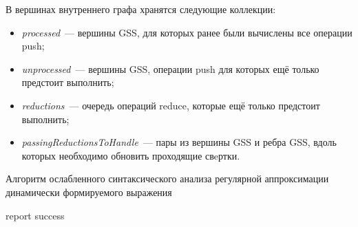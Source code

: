 В вершинах внутреннего графа хранятся следующие коллекции:
\begin{itemize}
  \item \emph{processed}~--- вершины GSS, для которых ранее были вычислены все операции push;
  \item \emph{unprocessed}~--- вершины GSS, операции push для которых ещё только предстоит выполнить;
  \item \emph{reductions}~--- очередь операций reduce, которые ещё только предстоит выполнить;
  \item \emph{passingReductionsToHandle}~--- пары из вершины GSS и ребра GSS, вдоль которых необходимо обновить проходящие свeртки.
\end{itemize}

\begin{algorithm}[H]
\begin{algorithmic}[1]
\caption{Алгоритм ослабленного синтаксического анализа регулярной аппроксимации динамически формируемого выражения}
\label{parsing}
    {report success}
    \EndIf
  \Else
    \EndWhile
    \EndIf
  \EndIf
\EndFunction
\end{algorithmic}
\end{algorithm}


